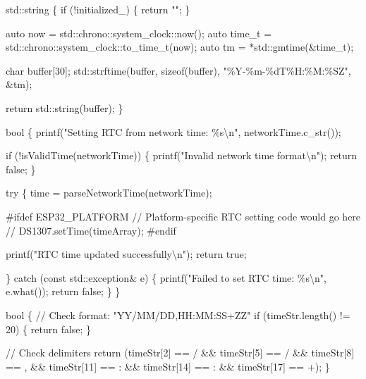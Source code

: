 std\+::string  \{ if (!initialized\+\_\+) \{ return "{}"{}; \}

auto now = std\+::chrono\+::system\+\_\+clock\+::now(); auto time\+\_\+t = std\+::chrono\+::system\+\_\+clock\+::to\+\_\+time\+\_\+t(now); auto tm = \texorpdfstring{$\ast$}{*}std\+::gmtime(\&time\+\_\+t);

char buffer\mbox{[}30\mbox{]}; std\+::strftime(buffer, sizeof(buffer), "{}\%\+Y-\/\%m-\/\%d\+T\%\+H\+:\%\+M\+:\%\+SZ"{}, \&tm);

return std\+::string(buffer); \}

bool  \{ printf("{}\+Setting RTC from network time\+: \%s\textbackslash{}n"{}, network\+Time.\+c\+\_\+str());

if (!is\+Valid\+Time(network\+Time)) \{ printf("{}\+Invalid network time format\textbackslash{}n"{}); return false; \}

try \{  time = parse\+Network\+Time(network\+Time);

\#ifdef ESP32\+\_\+\+PLATFORM // Platform-\/specific RTC setting code would go here // DS1307.\+set\+Time(time\+Array); \#endif

printf("{}\+RTC time updated successfully\textbackslash{}n"{}); return true;

\} catch (const std\+::exception\& e) \{ printf("{}\+Failed to set RTC time\+: \%s\textbackslash{}n"{}, e.\+what()); return false; \} \}

bool  \{ // Check format\+: "{}\+YY/\+MM/\+DD,\+HH\+:\+MM\+:\+SS+\+ZZ"{} if (time\+Str.\+length() != 20) \{ return false; \}

// Check delimiters return (time\+Str\mbox{[}2\mbox{]} == \textquotesingle{}/\textquotesingle{} \&\& time\+Str\mbox{[}5\mbox{]} == \textquotesingle{}/\textquotesingle{} \&\& time\+Str\mbox{[}8\mbox{]} == \textquotesingle{},\textquotesingle{} \&\& time\+Str\mbox{[}11\mbox{]} == \textquotesingle{}\+:\textquotesingle{} \&\& time\+Str\mbox{[}14\mbox{]} == \textquotesingle{}\+:\textquotesingle{} \&\& time\+Str\mbox{[}17\mbox{]} == \textquotesingle{}+\textquotesingle{}); \}

